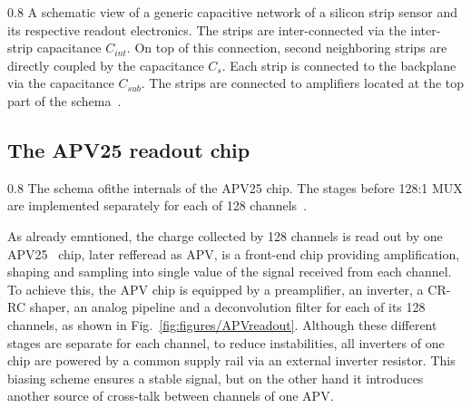                  {0.8}       %
                 {A schematic view of a generic capacitive network of a silicon strip sensor and its respective readout electronics. The strips are inter-connected via the inter-strip capacitance $C_{int}$. On top of this connection, second neighboring strips are directly coupled by the capacitance $C_{s}$. Each strip is connected to the backplane via the capacitance $C_{sub}$. The strips are connected to amplifiers located at the top part of the schema~\cite{Lutz:1987wd}.}




\subsection{The APV25 readout chip \label{sec:APV}}


                 {0.8}       %
                 {The schema ofithe internals of the APV25 chip. The stages before 128:1 MUX are implemented separately for each of 128 channels~\cite{Friedl:2001kra}. } %

As already emntioned, the charge collected by 128 channels is read out by one APV25~\cite{French:2001xb} chip, later refferead as APV, is a front-end chip providing amplification, shaping and sampling into single value of the signal received from each channel. To achieve this, the APV chip is equipped by a preamplifier, an inverter, a CR-RC shaper, an analog pipeline and a deconvolution filter for each of its 128 channels, as shown in Fig.~\ref{fig:figures/APVreadout}. Although these different stages are separate for each channel, to reduce instabilities, all inverters of one chip are powered by a common supply rail via an external inverter resistor. This biasing scheme ensures a stable signal, but on the other hand it introduces another source of cross-talk between channels of one APV.

